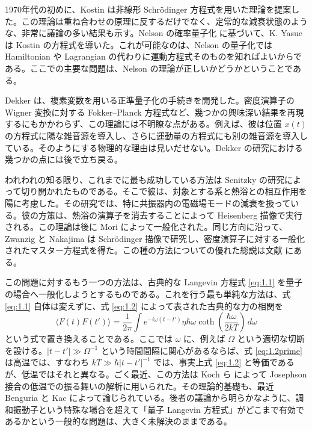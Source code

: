 1970年代の初めに、Kostin\cite{ref04} は非線形 Schrödinger 方程式を用いた理論を提案した。この理論は重ね合わせの原理に反するだけでなく、定常的な減衰状態のような、非常に議論の多い結果も示す。Nelson の確率量子化\cite{ref05} に基づいて、K. Yasue\cite{ref06} は Kostin の方程式を導いた。これが可能なのは、Nelson の量子化では Hamiltonian や Lagrangian の代わりに運動方程式そのものを知ればよいからである。ここでの主要な問題は、Nelson の理論が正しいかどうかということである。

Dekker\cite{ref07} は、複素変数を用いる正準量子化の手続きを開発した。密度演算子の Wigner 変換に対する Fokker--Planck 方程式など、幾つかの興味深い結果を再現するにもかかわらず、この理論には不明瞭な点がある。例えば、彼は位置 $x(t)$ の方程式に陽な雑音源を導入し、さらに運動量の方程式にも別の雑音源を導入している。そのようにする物理的な理由は見いだせない。Dekker の研究における幾つかの点には後で立ち戻る。

われわれの知る限り、これまでに最も成功している方法は Senitzky\cite{ref08} の研究によって切り開かれたものである。そこで彼は、対象とする系と熱浴との相互作用を陽に考慮した。その研究では、特に共振器内の電磁場モードの減衰を扱っている。彼の方策は、熱浴の演算子を消去することによって Heisenberg 描像で実行される。この理論は後に Mori\cite{ref09} によって一般化された。同じ方向に沿って、Zwanzig\cite{ref10} と Nakajima\cite{ref11} は Schrödinger 描像で研究し、密度演算子に対する一般化されたマスター方程式を得た。この種の方法についての優れた総説は文献 \cite{ref12,ref13} にある。

この問題に対するもう一つの方法は、古典的な Langevin 方程式 \eqref{eq:1.1} を量子の場合へ一般化しようとするものである。これを行う最も単純な方法は、式 \eqref{eq:1.1} 自体は変えずに、式 \eqref{eq:1.2} によって表された古典的な力の相関を
\begin{equation}
 \langle F(t)F(t')\rangle
 =\frac{1}{2\pi}\int e^{-i\omega(t-t')}\eta\hbar\omega
 \coth\left(\frac{\hbar\omega}{2kT}\right)\,d\omega
 \tag{1.2$'$}\label{eq:1.2prime}
\end{equation}
という式で置き換えることである。ここでは $\omega$ に、例えば $\Omega$ という適切な切断を設ける。$|t-t'|\gg\Omega^{-1}$ という時間間隔に関心があるならば、式 \eqref{eq:1.2prime} は高温では、すなわち $kT\gg\hbar|t-t'|^{-1}$ では、事実上式 \eqref{eq:1.2} と等価であるが、低温ではそれと異なる。ごく最近、この方法は Koch ら\cite{ref14} によって Josephson 接合の低温での振る舞いの解析に用いられた。その理論的基礎も、最近 Benguria と Kac\cite{ref15} によって論じられている。後者の議論から明らかなように、調和振動子という特殊な場合を超えて「量子 Langevin 方程式」がどこまで有効であるかという一般的な問題は、大きく未解決のままである。

